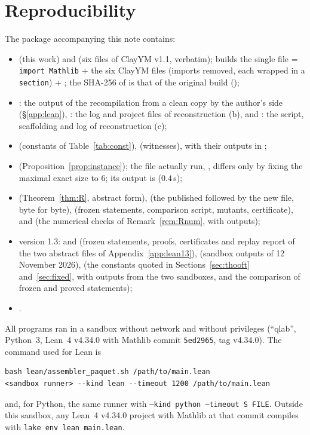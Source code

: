 \documentclass[11pt,a4paper]{article}
\theoremstyle{plain}
\theoremstyle{definition}
\theoremstyle{remark}
\numberwithin{equation}{section}
\begin{document}
\section{Reproducibility}\label{sec:repro}
The package accompanying this note contains:
\begin{itemize}
\item {} (this work) and  (six files of ClayYM v1.1, verbatim);
 builds the single file  = \texttt{import Mathlib} + the six ClayYM files (imports
removed, each wrapped in a \texttt{section}) + ; the SHA-256 of  is that of the original build
();
\item {}: the output of the recompilation from a clean copy by the author's side (\S\ref{app:lean}), 
: the log and project files of reconstruction (b), and : the script, scaffolding and log of reconstruction (c);
\item {} (constants of Table~\ref{tab:const}),  (witnesses), with their
outputs in ;
\item {} (Proposition~\ref{prop:instance}); the file actually run, , differs
only by fixing the maximal exact size to $6$; its output is  ($0.4$\,s);
\item {} (Theorem~\ref{thm:R}, abstract form),  (the published  followed by the new file, byte for byte),  (frozen statements, comparison script, mutants, certificate), and  (the numerical checks of Remark~\ref{rem:Rnum}, with outputs);
\item version 1.3:  and  (frozen statements, proofs, certificates and replay report of the two abstract files of Appendix~\ref{app:lean13}),  (sandbox outputs of 12 November 2026),  (the constants quoted in Sections~\ref{sec:thooft} and~\ref{sec:fixed}, with outputs from the two sandboxes, and the comparison of frozen and proved statements);
\item {}.
\end{itemize}
All programs ran in a sandbox without network and without privileges (``qlab'', Python~3, Lean~4 v4.34.0 with Mathlib commit
\texttt{5ed2965}, tag v4.34.0). The command used for Lean is
{\footnotesize
\begin{verbatim}
bash lean/assembler_paquet.sh /path/to/main.lean
<sandbox runner> --kind lean --timeout 1200 /path/to/main.lean
\end{verbatim}}
\noindent and, for Python, the same runner with \texttt{--kind python --timeout S FILE}. Outside this sandbox, any Lean~4 v4.34.0 project with
Mathlib at that commit compiles  with \texttt{lake env lean main.lean}.
\end{document}

